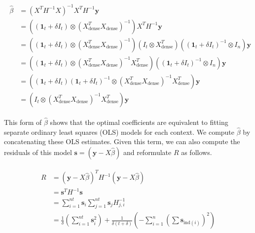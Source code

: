        \begin{align}
        \begin{split}
            \hat{\beta} & = (X^TH^{-1}X)^{-1}X^TH^{-1}\mathbf{y} \\
                        & = \left((\mathbf{1}_{t} + \delta I_t) \otimes (X^T_{\text{dense}}X_{\text{dense}})^{-1}\right)X^TH^{-1}\mathbf{y} \\
                        & = \left((\mathbf{1}_{t} + \delta I_t) \otimes (X^T_{\text{dense}}X_{\text{dense}})^{-1}\right)(I_t \otimes X^T_{\text{dense}})((\mathbf{1}_{t} + \delta I_t)^{-1} \otimes I_n )\mathbf{y} \\
                        & = \left((\mathbf{1}_{t} + \delta I_t) \otimes (X^T_{\text{dense}}X_{\text{dense}})^{-1}X^T_{\text{dense}}\right)((\mathbf{1}_{t} + \delta I_t)^{-1} \otimes I_n )\mathbf{y} \\
                        & = \left((\mathbf{1}_{t} + \delta I_t) (\mathbf{1}_{t} + \delta I_t)^{-1}\otimes (X^T_{\text{dense}}X_{\text{dense}})^{-1}X^T_{\text{dense}}\right)\mathbf{y} \\
                        & = \left(I_t\otimes (X^T_{\text{dense}}X_{\text{dense}})^{-1}X^T_{\text{dense}}\right)\mathbf{y}
        \end{split}
        \end{align}
        
        This form of $\hat{\beta}$ shows that the optimal coefficients are equivalent to fitting separate ordinary least squares (OLS) models for each context. We compute $\hat{\beta}$ by concatenating these OLS estimates. Given this term, we can also compute the residuals of this model $\mathbf{s} = (\mathbf{y} - X\hat{\beta})$ and reformulate $R$ as follows.
        
        \begin{align}
        \begin{split}
            R & = (\mathbf{y} - X\hat{\beta})^TH^{-1}(\mathbf{y} - X\hat{\beta}) \\
              & = \mathbf{s}^TH^{-1}\mathbf{s} \\
              & = \sum_{i=1}^{nt}\mathbf{s}_i \sum_{j=1}^{nt} \mathbf{s}_j H^{-1}_{j,i} \\
              & = \frac{1}{\delta} \left(\sum_{i=1}^{nt} \mathbf{s}_i^2 \right) + \frac{1}{\delta(t + \delta)} \left(-\sum_{i=1}^{n} \left(\sum \mathbf{s}_{\text{ind}(i)}\right)^2\right)
        \end{split}
        \end{align}
    
